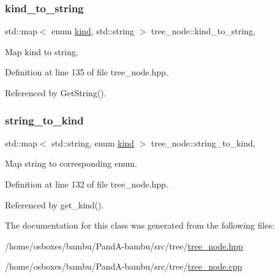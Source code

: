 \subsubsection{\texorpdfstring{kind\+\_\+to\+\_\+string}{kind\_to\_string}}
{\footnotesize\ttfamily std\+::map$<$ enum \hyperlink{tree__common_8hpp_a9efbd7c7191fb190b76c2fd05d6e7b45}{kind}, std\+::string $>$ tree\+\_\+node\+::kind\+\_\+to\+\_\+string\hspace{0.3cm}{\ttfamily [static]}, {\ttfamily [private]}}



Map kind to string. 



Definition at line 135 of file tree\+\_\+node.\+hpp.



Referenced by Get\+String().

\mbox{\label{classtree__node_a7e8912d45db001a06ab7825ea3dc62c6}} 
\subsubsection{\texorpdfstring{string\+\_\+to\+\_\+kind}{string\_to\_kind}}
{\footnotesize\ttfamily std\+::map$<$ std\+::string, enum \hyperlink{tree__common_8hpp_a9efbd7c7191fb190b76c2fd05d6e7b45}{kind} $>$ tree\+\_\+node\+::string\+\_\+to\+\_\+kind\hspace{0.3cm}{\ttfamily [static]}, {\ttfamily [private]}}



Map string to corresponding enum. 



Definition at line 132 of file tree\+\_\+node.\+hpp.



Referenced by get\+\_\+kind().



The documentation for this class was generated from the following files\+:\begin{DoxyCompactItemize}
\item 
/home/osboxes/bambu/\+Pand\+A-\/bambu/src/tree/\hyperlink{tree__node_8hpp}{tree\+\_\+node.\+hpp}\item 
/home/osboxes/bambu/\+Pand\+A-\/bambu/src/tree/\hyperlink{tree__node_8cpp}{tree\+\_\+node.\+cpp}\end{DoxyCompactItemize}
